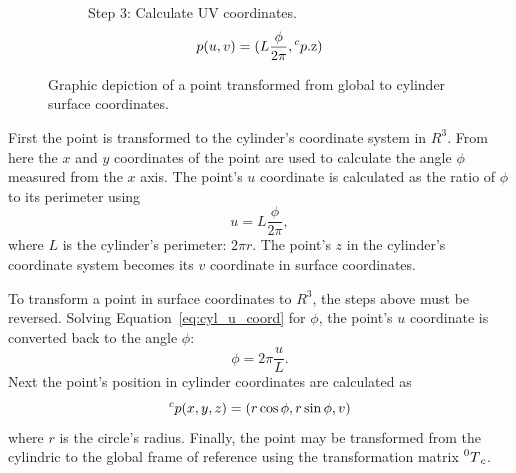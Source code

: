 \begin{figure}[htb]
\begin{subfigure}[b]{0.3\textwidth}
		\centering
{}
		\caption{%
Step 3: Calculate UV coordinates.
\begin{equation*}
	p(u,v) = (L \frac{\phi}{2\pi}, \prescript{c}{}p\text{.z})
\end{equation*}
}
	\end{subfigure}
	\caption{Graphic depiction of a point transformed from global to cylinder surface coordinates.}
	\label{fig:gl_ccyl_transform_steps}
\end{figure}

First the point is transformed to the cylinder's coordinate system in $R^3$.
From here the $x$ and $y$ coordinates of the point are used to calculate the angle $\phi$ measured from the $x$ axis.
The point's $u$ coordinate is calculated as the ratio of $\phi$ to its perimeter using
\begin{equation}\label{eq:cyl_u_coord}
	u = L \frac{\phi}{2\pi},
\end{equation}
where $L$ is the cylinder's perimeter: $2\pi r$.
The point's $z$ in the cylinder's coordinate system becomes its $v$ coordinate in surface coordinates.

To transform a point in surface coordinates to $R^3$, the steps above must be reversed.
Solving Equation~\ref{eq:cyl_u_coord} for $\phi$, the point's $u$ coordinate is converted back to the angle $\phi$:
\begin{equation*}
	\phi = 2\pi \frac{u}{L}.
\end{equation*}
Next the point's position in cylinder coordinates are calculated as
\begin{equation*}
	\prescript{c}{}p(x,y,z) = (r \cos \phi, r \sin \phi, v)
\end{equation*}
where $r$ is the circle's radius.
Finally, the point may be transformed from the cylindric to the global frame of reference using the transformation matrix $\prescript{0}{}T_c$.

